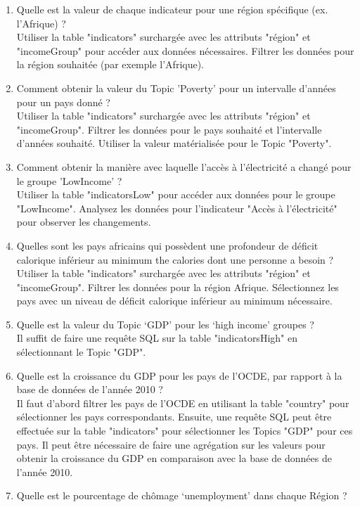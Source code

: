 \begin{enumerate} 
    \item Quelle est la valeur de chaque indicateur pour une région spécifique (ex. l’Afrique) ?\\
Utiliser la table "indicators" surchargée avec les attributs "région" et "incomeGroup" pour accéder aux données nécessaires.
Filtrer les données pour la région souhaitée (par exemple l'Afrique).
\item Comment obtenir la valeur du Topic ’Poverty’ pour un intervalle d’années pour un pays donné ?\\
Utiliser la table "indicators" surchargée avec les attributs "région" et "incomeGroup".
Filtrer les données pour le pays souhaité et l'intervalle d'années souhaité.
Utiliser la valeur matérialisée pour le Topic "Poverty".
\item Comment obtenir la manière avec laquelle l’accès à l’électricité a changé pour le groupe ’LowIncome’ ?\\
Utiliser la table "indicatorsLow" pour accéder aux données pour le groupe "LowIncome".
Analysez les données pour l'indicateur "Accès à l'électricité" pour observer les changements.
\item Quelles sont les pays africains qui possèdent une profondeur de déficit calorique inférieur au minimum the calories dont une personne a besoin ?\\
Utiliser la table "indicators" surchargée avec les attributs "région" et "incomeGroup".
Filtrer les données pour la région Afrique.
Sélectionnez les pays avec un niveau de déficit calorique inférieur au minimum nécessaire.
\item Quelle est la valeur du Topic ‘GDP’ pour les ‘high income’ groupes ?\\
Il suffit de faire une requête SQL sur la table "indicatorsHigh" en sélectionnant le Topic "GDP".
\item Quelle est la croissance du GDP pour les pays de l’OCDE, par rapport à la base de données de l’année 2010 ?\\
Il faut d'abord filtrer les pays de l'OCDE en utilisant la table "country" pour sélectionner les pays correspondants.
Ensuite, une requête SQL peut être effectuée sur la table "indicators" pour sélectionner les Topics "GDP" pour ces pays.
Il peut être nécessaire de faire une agrégation sur les valeurs pour obtenir la croissance du GDP en comparaison avec la base de données de l'année 2010.
\item Quelle est le pourcentage de chômage ‘unemployment’ dans chaque Région ?\\

\end{enumerate}
